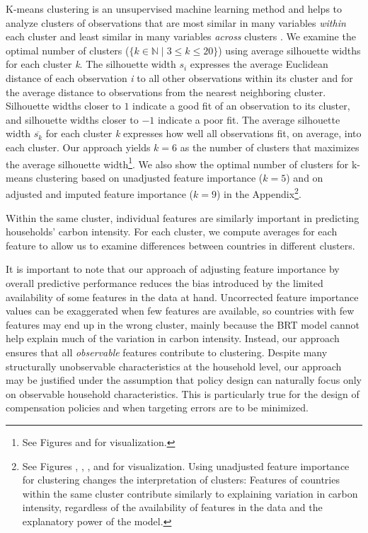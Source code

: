 \documentclass[12pt, a4paper]{article}
\begin{document}
K-means clustering is an unsupervised machine learning method and helps to analyze clusters of observations that are most similar in many variables \textit{within} each cluster and least similar in many variables \textit{across} clusters \autocite{MacQueen.1967}. We examine the optimal number of clusters ($\{k \in \mathbb{N} \mid 3  \leq k \leq 20 \}$) using average silhouette widths \autocite{Rousseeuw.1987} for each cluster \textit{k}. The silhouette width $s_{i}$ expresses the average Euclidean distance of each observation \textit{i} to all other observations within its cluster and for the average distance to observations from the nearest neighboring cluster. Silhouette widths closer to $1$ indicate a good fit of an observation to its cluster, and silhouette widths closer to $-1$ indicate a poor fit. The average silhouette width $\overline{s_{k}}$ for each cluster \textit{k} expresses how well all observations fit, on average, into each cluster. Our approach yields $k = 6$ as the number of clusters that maximizes the average silhouette width\footnote{See Figures  and  for visualization.}. We also show the optimal number of clusters for k-means clustering based on unadjusted feature importance ($k = 5$) and on adjusted and imputed feature importance ($k=9$) in the Appendix\footnote{See Figures , , , and  for visualization. Using unadjusted feature importance for clustering changes the interpretation of clusters: Features of countries within the same cluster contribute similarly to explaining variation in carbon intensity, regardless of the availability of features in the data and the explanatory power of the model.}.

Within the same cluster, individual features are similarly important in predicting households' carbon intensity. For each cluster, we compute averages for each feature to allow us to examine differences between countries in different clusters.%

It is important to note that our approach of adjusting feature importance by overall predictive performance reduces the bias introduced by the limited availability of some features in the data at hand. Uncorrected feature importance values can be exaggerated when few features are available, so countries with few features may end up in the wrong cluster, mainly because the BRT model cannot help explain much of the variation in carbon intensity. Instead, our approach ensures that all \textit{observable} features contribute to clustering. Despite many structurally unobservable characteristics at the household level, our approach may be justified under the assumption that policy design can naturally focus only on observable household characteristics. This is particularly true for the design of compensation policies and when targeting errors are to be minimized.
\end{document}
